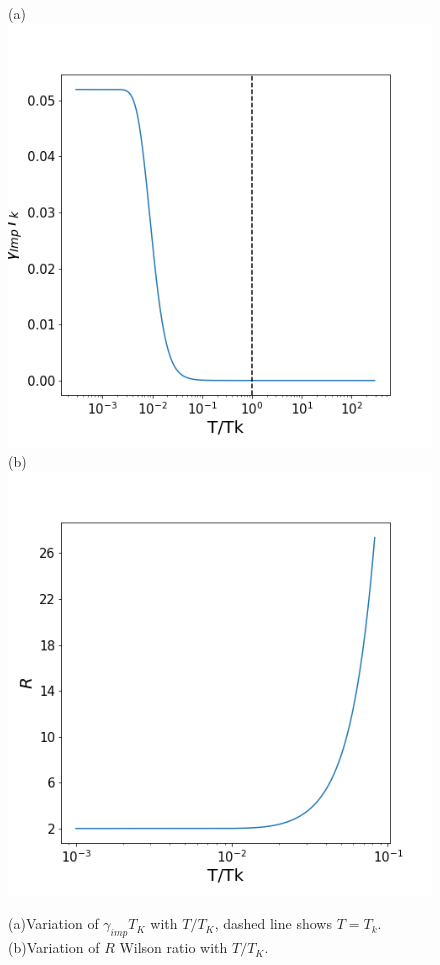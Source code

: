 \documentclass[aps,prb,preprint,groupedaddress]{revtex4-2}
\begin{document}
\begin{figure}
(a)\includegraphics[scale=0.5]{specificHeatCoeff.png}
(b)\includegraphics[scale=0.5]{WilsonRatio.png}
\caption{(a)Variation of $\gamma_{imp}T_{K}$ with $T/T_{K}$, dashed line shows $T=T_{k}$. (b)Variation of $R$ Wilson ratio with $T/T_{K}$.}
\label{specheat}
\end{figure}
\end{document}
